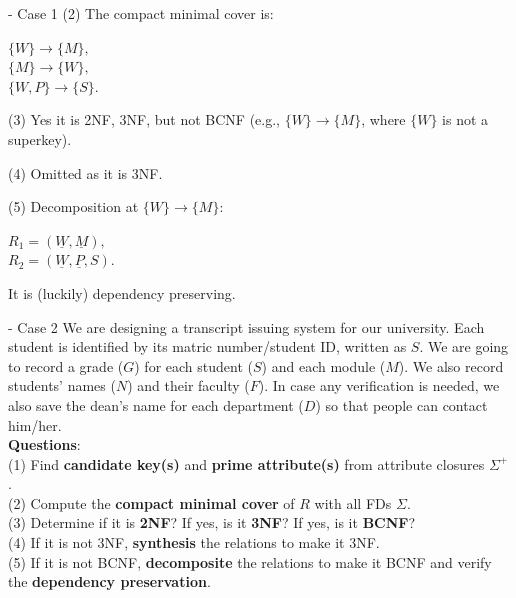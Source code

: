 \begin{frame}[fragile]{ - Case 1}
	(2) The compact minimal cover is:\\\vspace{5pt}
	
	$\{W\} \rightarrow \{M\},$\\
	$\{M\}  \rightarrow \{W\},$\\
	$\{W, P\} \rightarrow \{S\}.$\\\vspace{5pt}

	(3)  Yes it is 2NF, 3NF, but not BCNF (e.g., $\{W\} \rightarrow \{M\}$, where $\{W\}$ is not a superkey).\\\vspace{5pt}
	
	(4) Omitted as it is 3NF. \\\vspace{5pt}
	
	(5) Decomposition at $\{W\} \rightarrow \{M\}$:\\\vspace{5pt}
	
	$R_1 = (\underline{W}, \underline{M}),$\\
	$R_2 = (\underline{W}, \underline{P}, S).$\\\vspace{5pt}
	
	It is (luckily) dependency preserving.
		
\end{frame}

\begin{frame}[fragile]{ - Case 2}
	We are designing a transcript issuing system for our university. 
	Each student is identified by its matric number/student ID, written as $S$.
	We are going to record a grade ($G$) for each student ($S$) and each module ($M$).
	We also record students' names ($N$) and their faculty ($F$). In case any verification is needed, we also save the dean's name for each department ($D$) so that people can contact him/her.\\\vspace{10pt}
	\textbf{Questions}:\\
	(1) Find \textbf{candidate key(s)} and \textbf{prime attribute(s)} from attribute closures $\Sigma^{+}$.\\
	(2) Compute the \textbf{compact minimal cover} of $R$ with all FDs $\Sigma$.\\
	(3) Determine if it is \textbf{2NF}? If yes, is it \textbf{3NF}? If yes, is it \textbf{BCNF}?\\
	(4) If it is not 3NF, \textbf{synthesis} the relations to make it 3NF.\\
	(5) If it is not BCNF, \textbf{decomposite} the relations to make it BCNF and verify the \textbf{dependency preservation}. 
\end{frame}

